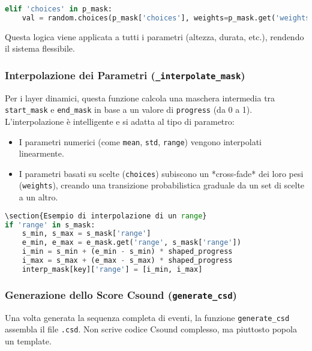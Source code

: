 \begin{lstlisting}[language=Python]
elif 'choices' in p_mask:
    val = random.choices(p_mask['choices'], weights=p_mask.get('weights'), k=1)[0]
\end{lstlisting}

Questa logica viene applicata a tutti i parametri (altezza, durata, etc.), rendendo il sistema flessibile.
\subsubsection{Interpolazione dei Parametri (\texttt{\_interpolate\_mask})}
Per i layer dinamici, questa funzione calcola una maschera intermedia tra \texttt{start\_mask} e \texttt{end\_mask} in base a un valore di \texttt{progress} (da 0 a 1). L'interpolazione è intelligente e si adatta al tipo di parametro:
\begin{itemize}
    \item I parametri numerici (come \texttt{mean}, \texttt{std}, \texttt{range}) vengono interpolati linearmente.
    \item I parametri basati su scelte (\texttt{choices}) subiscono un *cross-fade* dei loro pesi (\texttt{weights}), creando una transizione probabilistica graduale da un set di scelte a un altro.
\end{itemize}

\begin{lstlisting}[language=Python]
\section{Esempio di interpolazione di un range}
if 'range' in s_mask:
    s_min, s_max = s_mask['range']
    e_min, e_max = e_mask.get('range', s_mask['range'])
    i_min = s_min + (e_min - s_min) * shaped_progress
    i_max = s_max + (e_max - s_max) * shaped_progress
    interp_mask[key]['range'] = [i_min, i_max]
\end{lstlisting}
\subsubsection{Generazione dello Score Csound (\texttt{generate\_csd})}
Una volta generata la sequenza completa di eventi, la funzione \texttt{generate\_csd} assembla il file \texttt{.csd}. Non scrive codice Csound complesso, ma piuttosto popola un template.

